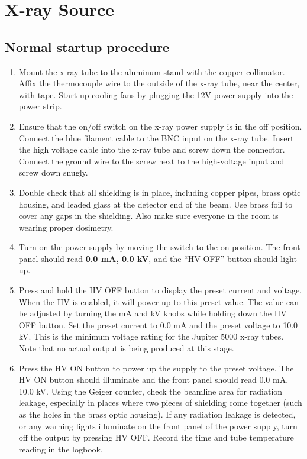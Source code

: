 \chapter{X-ray Source}

\section{Normal startup procedure\label{sec:src_startup}}

\begin{enumerate}

\item Mount the x-ray tube to the aluminum stand with the copper collimator. Affix the thermocouple wire to the outside of the x-ray tube, near the center, with tape. Start up cooling fans by plugging the 12V power supply into the power strip.

\item Ensure that the on/off switch on the x-ray power supply is in the off position. Connect the blue filament cable to the BNC input on the x-ray tube. Insert the high voltage cable into the x-ray tube and screw down the connector. Connect the ground wire to the screw next to the high-voltage input and screw down snugly.

\item Double check that all shielding is in place, including copper pipes, brass optic housing, and leaded glass at the detector end of the beam. Use brass foil to cover any gaps in the shielding. Also make sure everyone in the room is wearing proper dosimetry.

\item Turn on the power supply by moving the switch to the on position. The front panel should read \textbf{0.0 mA, 0.0 kV}, and the “HV OFF” button should light up.

\item Press and hold the HV OFF button to display the preset current and voltage. When the HV is enabled, it will power up to this preset value. The value can be adjusted by turning the mA and kV knobs while holding down the HV OFF button. Set the preset current to 0.0 mA and the preset voltage to 10.0 kV. This is the minimum voltage rating for the Jupiter 5000 x-ray tubes. Note that no actual output is being produced at this stage.

\item \label{item:on} Press the HV ON button to power up the supply to the preset voltage. The HV ON button should illuminate and the front panel should read 0.0 mA, 10.0 kV. Using the Geiger counter, check the beamline area for radiation leakage, especially in places where two pieces of shielding come together (such as the holes in the brass optic housing). If any radiation leakage is detected, or any warning lights illuminate on the front panel of the power supply, turn off the output by pressing HV OFF. Record the time and tube temperature reading in the logbook. 


\end{enumerate}
